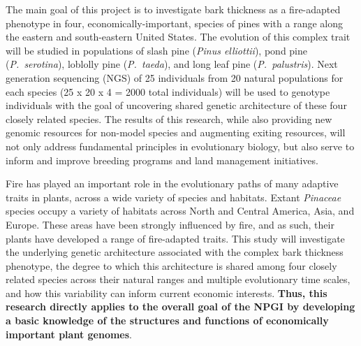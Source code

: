 


The main goal of this project is to investigate bark thickness as a fire-adapted phenotype in four, economically-important, 
species of pines with a range along the eastern and south-eastern United States.  The evolution of this complex trait will 
be studied in populations of slash pine (\textit{Pinus elliottii}), pond pine (\textit{P.\ serotina}), loblolly pine (\textit{P.\ taeda}), 
and long leaf pine (\textit{P.\ palustris}).  Next generation sequencing (NGS) of 25 individuals from 20 natural populations for each 
species (25 x 20 x 4 = 2000 total individuals) will be used to genotype individuals with the goal of uncovering shared 
genetic architecture of these four closely related species. The results of this research, while also providing new genomic 
resources for non-model species and augmenting exiting resources, will not only address fundamental principles in 
evolutionary biology, but also serve to inform and improve breeding programs and land management initiatives.

Fire has played an important role in the evolutionary paths of many adaptive traits in plants, across a wide variety of species 
and habitats.  Extant \textit{Pinaceae} species occupy a variety of habitats across North and Central America, Asia, and Europe.  
These areas have been strongly influenced by fire, and as such, their plants have developed a range 
of fire-adapted traits.  This study will investigate the underlying genetic architecture associated with the complex 
bark thickness phenotype, the degree to which this architecture is shared among four closely related species across their natural 
ranges and multiple evolutionary time scales, and how this variability can inform current economic interests.  \textbf{Thus, this research 
directly applies to the overall goal of the NPGI by developing a basic knowledge of the structures and functions of economically 
important plant genomes}.


